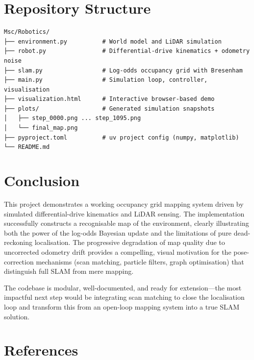\documentclass[12pt,a4paper]{article}
\begin{document}
\section{Repository Structure}

\begin{verbatim}
Msc/Robotics/
├── environment.py          # World model and LiDAR simulation
├── robot.py                # Differential-drive kinematics + odometry noise
├── slam.py                 # Log-odds occupancy grid with Bresenham
├── main.py                 # Simulation loop, controller, visualisation
├── visualization.html      # Interactive browser-based demo
├── plots/                  # Generated simulation snapshots
│   ├── step_0000.png ... step_1095.png
│   └── final_map.png
├── pyproject.toml          # uv project config (numpy, matplotlib)
└── README.md
\end{verbatim}

\section{Conclusion}

This project demonstrates a working occupancy grid mapping system driven by simulated differential-drive kinematics and LiDAR sensing. The implementation successfully constructs a recognisable map of the environment, clearly illustrating both the power of the log-odds Bayesian update and the limitations of pure dead-reckoning localisation. The progressive degradation of map quality due to uncorrected odometry drift provides a compelling, visual motivation for the pose-correction mechanisms (scan matching, particle filters, graph optimisation) that distinguish full SLAM from mere mapping.

The codebase is modular, well-documented, and ready for extension---the most impactful next step would be integrating scan matching to close the localisation loop and transform this from an open-loop mapping system into a true SLAM solution.

\section*{References}
\end{document}
